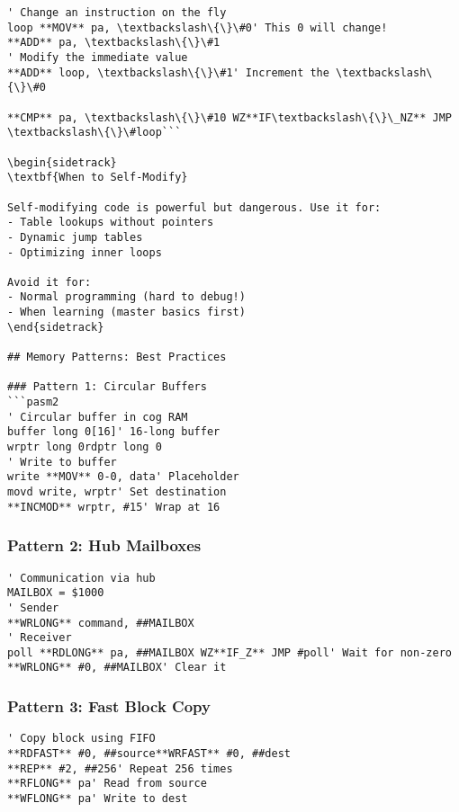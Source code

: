 \documentclass[11pt]{book}
\begin{document}
\begin{lstlisting}
' Change an instruction on the fly
loop **MOV** pa, \textbackslash\{\}\#0' This 0 will change!
**ADD** pa, \textbackslash\{\}\#1        
' Modify the immediate value
**ADD** loop, \textbackslash\{\}\#1' Increment the \textbackslash\{\}\#0
        
**CMP** pa, \textbackslash\{\}\#10 WZ**IF\textbackslash\{\}\_NZ** JMP \textbackslash\{\}\#loop```

\begin{sidetrack}
\textbf{When to Self-Modify}

Self-modifying code is powerful but dangerous. Use it for:
- Table lookups without pointers
- Dynamic jump tables
- Optimizing inner loops

Avoid it for:
- Normal programming (hard to debug!)
- When learning (master basics first)
\end{sidetrack}

## Memory Patterns: Best Practices

### Pattern 1: Circular Buffers
```pasm2
' Circular buffer in cog RAM
buffer long 0[16]' 16-long buffer
wrptr long 0rdptr long 0
' Write to buffer
write **MOV** 0-0, data' Placeholder
movd write, wrptr' Set destination
**INCMOD** wrptr, #15' Wrap at 16
\end{lstlisting}

\hypertarget{pattern-2-hub-mailboxes}{%
\subsubsection{Pattern 2: Hub Mailboxes}\label{pattern-2-hub-mailboxes}}

\begin{lstlisting}
' Communication via hub
MAILBOX = $1000
' Sender
**WRLONG** command, ##MAILBOX        
' Receiver  
poll **RDLONG** pa, ##MAILBOX WZ**IF_Z** JMP #poll' Wait for non-zero
**WRLONG** #0, ##MAILBOX' Clear it
\end{lstlisting}

\hypertarget{pattern-3-fast-block-copy}{%
\subsubsection{Pattern 3: Fast Block
Copy}\label{pattern-3-fast-block-copy}}

\begin{lstlisting}
' Copy block using FIFO
**RDFAST** #0, ##source**WRFAST** #0, ##dest        
**REP** #2, ##256' Repeat 256 times
**RFLONG** pa' Read from source
**WFLONG** pa' Write to dest
\end{lstlisting}
\end{document}
